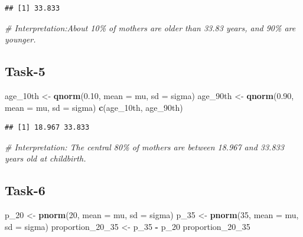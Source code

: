 \documentclass[
]{article}
\newenvironment{Shaded}{\begin{snugshade}}{\end{snugshade}}
\newcommand{\AttributeTok}[1]{\textcolor[rgb]{0.13,0.29,0.53}{#1}}
\newcommand{\CommentTok}[1]{\textcolor[rgb]{0.56,0.35,0.01}{\textit{#1}}}
\newcommand{\DecValTok}[1]{\textcolor[rgb]{0.00,0.00,0.81}{#1}}
\newcommand{\FloatTok}[1]{\textcolor[rgb]{0.00,0.00,0.81}{#1}}
\newcommand{\FunctionTok}[1]{\textcolor[rgb]{0.13,0.29,0.53}{\textbf{#1}}}
\newcommand{\NormalTok}[1]{#1}
\newcommand{\OtherTok}[1]{\textcolor[rgb]{0.56,0.35,0.01}{#1}}
\newcommand{\SpecialCharTok}[1]{\textcolor[rgb]{0.81,0.36,0.00}{\textbf{#1}}}
\begin{document}
\begin{verbatim}
## [1] 33.833
\end{verbatim}

\begin{Shaded}
\begin{Highlighting}[]
\CommentTok{\# Interpretation:About 10\% of mothers are older than 33.83 years, and 90\% are younger.}
\end{Highlighting}
\end{Shaded}

\subsection{Task-5}\label{task-5}

\begin{Shaded}
\begin{Highlighting}[]
\NormalTok{age\_10th }\OtherTok{\textless{}{-}} \FunctionTok{qnorm}\NormalTok{(}\FloatTok{0.10}\NormalTok{, }\AttributeTok{mean =}\NormalTok{ mu, }\AttributeTok{sd =}\NormalTok{ sigma)}
\NormalTok{age\_90th }\OtherTok{\textless{}{-}} \FunctionTok{qnorm}\NormalTok{(}\FloatTok{0.90}\NormalTok{, }\AttributeTok{mean =}\NormalTok{ mu, }\AttributeTok{sd =}\NormalTok{ sigma)}
\FunctionTok{c}\NormalTok{(age\_10th, age\_90th)}
\end{Highlighting}
\end{Shaded}

\begin{verbatim}
## [1] 18.967 33.833
\end{verbatim}

\begin{Shaded}
\begin{Highlighting}[]
\CommentTok{\# Interpretation: The central 80\% of mothers are between 18.967 and 33.833 years old at childbirth.}
\end{Highlighting}
\end{Shaded}

\subsection{Task-6}\label{task-6}

\begin{Shaded}
\begin{Highlighting}[]
\NormalTok{p\_20 }\OtherTok{\textless{}{-}} \FunctionTok{pnorm}\NormalTok{(}\DecValTok{20}\NormalTok{, }\AttributeTok{mean =}\NormalTok{ mu, }\AttributeTok{sd =}\NormalTok{ sigma)}
\NormalTok{p\_35 }\OtherTok{\textless{}{-}} \FunctionTok{pnorm}\NormalTok{(}\DecValTok{35}\NormalTok{, }\AttributeTok{mean =}\NormalTok{ mu, }\AttributeTok{sd =}\NormalTok{ sigma)}
\NormalTok{proportion\_20\_35 }\OtherTok{\textless{}{-}}\NormalTok{ p\_35 }\SpecialCharTok{{-}}\NormalTok{ p\_20}
\NormalTok{proportion\_20\_35}
\end{Highlighting}
\end{Shaded}
\end{document}
